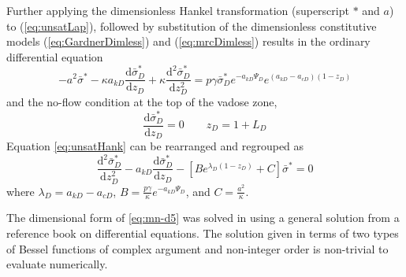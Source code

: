\documentclass[12pt,letterpaper]{article}
\begin{document}
Further applying the dimensionless Hankel transformation (superscript
$\ast$ and $a$) to (\ref{eq:unsatLap}), followed by substitution of
the dimensionless constitutive models (\ref{eq:GardnerDimless}) and
(\ref{eq:mrcDimless}) results in the ordinary differential equation
\begin{equation}
  \label{eq:unsatHank}
   -a^2 \bar{\sigma}^{\ast} - \kappa a_{kD} \frac{\mathrm{d} \bar{\sigma}_D^{\ast}}{\mathrm{d} z_D} + \kappa \frac{\mathrm{d}^2 \bar{\sigma}_D^{\ast}}{\mathrm{d} z_D^2}  = p \gamma \bar{\sigma}_D^{\ast}  e^{-a_{kD} \Psi_D}  e^{\left(a_{kD} -a_{cD} \right)\left( 1 - z_D\right)}
\end{equation}
and the no-flow condition at the top of the vadose zone,
\begin{equation}\nonumber
 \frac{\mathrm{d}\bar{\sigma}_D^{\ast}}{\mathrm{d}z_D}=0 \qquad z_D=1+L_D
\end{equation}
Equation \ref{eq:unsatHank} can be rearranged and regrouped as
\begin{equation}
  \label{eq:mn-d5}
  \frac{\mathrm{d}^2 \bar{\sigma}_D^{\ast}}{\mathrm{d}z_D^2} - a_{kD} \frac{\mathrm{d} \bar{\sigma}_D^{\ast}}{\mathrm{d}z_D} - \left[ B e^{\lambda_D (1-z_D)} + C\right] \bar{\sigma}^{\ast}=0
\end{equation}
where $\lambda_D = a_{kD} - a_{cD}$, $B = \frac{p\gamma}{\kappa}
e^{-a_{kD} \Psi_D}$, and $C=\frac{a^2}{\kappa}$.

The dimensional form of \eqref{eq:mn-d5} was solved in \cite{mishra10}
using a general solution from a reference book on differential
equations.  The solution given in terms of two types of Bessel
functions of complex argument and non-integer order is non-trivial to
evaluate numerically.
\end{document}
